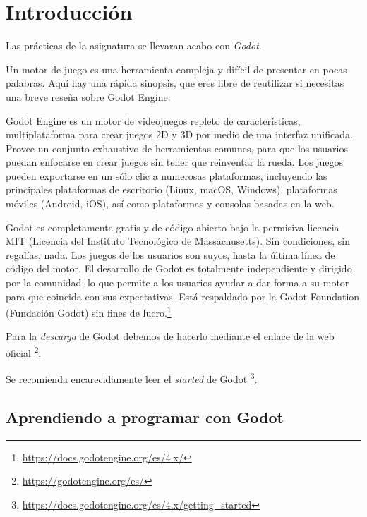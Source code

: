\documentclass[12pt]{book} %
\begin{document}
\hypertarget{introducciuxf3n-1}{%
\chapter{Introducción}\label{introducciuxf3n-1}}

Las prácticas de la asignatura se llevaran acabo con \emph{Godot}.

Un motor de juego es una herramienta compleja y difícil de presentar en
pocas palabras. Aquí hay una rápida sinopsis, que eres libre de
reutilizar si necesitas una breve reseña sobre Godot Engine:

Godot Engine es un motor de videojuegos repleto de características,
multiplataforma para crear juegos 2D y 3D por medio de una interfaz
unificada. Provee un conjunto exhaustivo de herramientas comunes, para
que los usuarios puedan enfocarse en crear juegos sin tener que
reinventar la rueda. Los juegos pueden exportarse en un sólo clic a
numerosas plataformas, incluyendo las principales plataformas de
escritorio (Linux, macOS, Windows), plataformas móviles (Android, iOS),
así como plataformas y consolas basadas en la web.

Godot es completamente gratis y de código abierto bajo la permisiva
licencia MIT (Licencia del Instituto Tecnológico de Massachusetts). Sin
condiciones, sin regalías, nada. Los juegos de los usuarios son suyos,
hasta la última línea de código del motor. El desarrollo de Godot es
totalmente independiente y dirigido por la comunidad, lo que permite a
los usuarios ayudar a dar forma a su motor para que coincida con sus
expectativas. Está respaldado por la Godot Foundation (Fundación Godot)
sin fines de lucro.\footnote{\url{https://docs.godotengine.org/es/4.x/}}

Para la \emph{descarga} de Godot debemos de hacerlo mediante el enlace
de la web oficial \footnote{\url{https://godotengine.org/es/}}.


Se recomienda encarecidamente leer el \emph{started} de Godot
\footnote{\url{https://docs.godotengine.org/es/4.x/getting_started}}.

\hypertarget{aprendiendo-a-programar-con-godot}{%
\section{Aprendiendo a programar con
Godot}\label{aprendiendo-a-programar-con-godot}}
\end{document}
